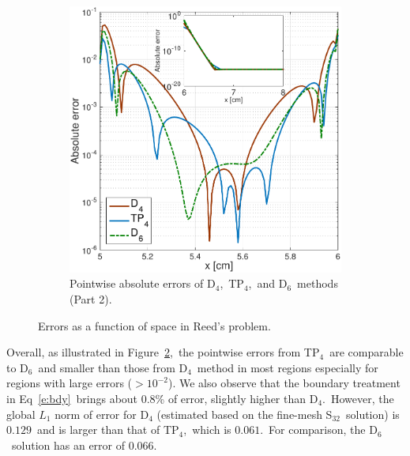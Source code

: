 \documentclass[review]{elsarticle}
\newcommand{\pn}{P$_N$}
\newcommand{\dn}{D$_N$}
\begin{document}
\begin{figure}[ht!]
\begin{subfigure}{.5\textwidth}
	\begin{center}
		\includegraphics[width=1.\textwidth]{reed_error22.pdf}
		\caption[]{Pointwise absolute errors of D$_4$,\ TP$_4$,\ and D$_6$\ methods (Part 2).}%
		\label{reed_er2}
	\end{center}
\end{subfigure}
\caption[]{\label{reed_error}Errors as a function of space in Reed's problem.}
\end{figure}

{Overall, as illustrated in Figure\ \ref{reed_error},\ the pointwise errors from TP$_4$\ are comparable to D$_6$\ and  smaller than those from D$_4$\ method in most regions especially for regions with large errors ($>10^{-2}$). We also observe that the boundary treatment in Eq~\eqref{e:bdy}\ brings about 0.8\% of error, slightly higher than D$_4$.\ However, the global $L_1$ norm of error for D$_4$ (estimated based on the fine-mesh S$_{32}$\ solution) is $0.129$\ and is larger than that of TP$_4$,\ which is $0.061$.\ For comparison, the D$_6$\ solution has an error of $0.066$.}

\end{document}
